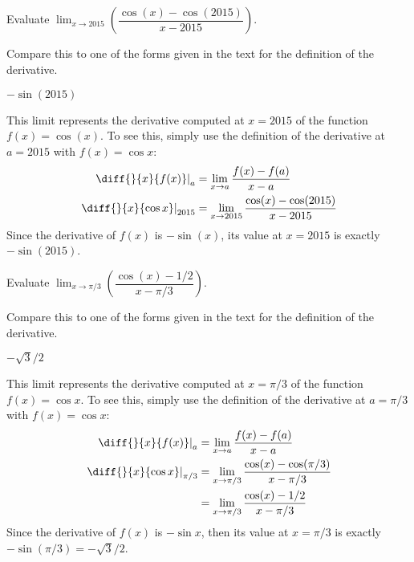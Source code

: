\subsection*{\Application}

\begin{question}[2015Q]
 Evaluate $\displaystyle \lim_{x\to 2015}\left(
\dfrac{\cos(x)-\cos(2015)}{x-2015}\right).$
\end{question}
\begin{hint}
Compare this to one of the forms given in the text for the definition of the derivative.
\end{hint}
\begin{answer}
{$-\sin(2015)$}
\end{answer}
\begin{solution}
This limit represents the derivative computed at $x=2015$ of the function
$f(x)=\cos(x)$. To see this, simply use the definition of the derivative at $a=2015$ with $f(x)=\cos x$:
\begin{align*}
\left.\diff{}{x}\{f(x)\}\right|_{a} &= \lim_{x \to a}\frac{f(x)-f(a)}{x-a}\\
\left.\diff{}{x}\{\cos x\}\right|_{2015} &= \lim_{x\to2015}\frac{\cos(x)-\cos(2015)}{x-2015}
\end{align*}
Since the derivative of $f(x)$ is $-\sin(x)$, its value at
$x=2015$ is exactly $-\sin(2015)$.
\end{solution}




\begin{question}[2015Q]
Evaluate $\displaystyle \lim_{x\to \pi/3}\left(
\dfrac{\cos(x)-1/2}{x-\pi/3}\right).$
\end{question}
\begin{hint}
Compare this to one of the forms given in the text for the definition of the derivative.
\end{hint}
\begin{answer}
{$-\sqrt{3}/2$}
\end{answer}
\begin{solution}
This limit represents the derivative computed at $x=\pi/3$ of the function
$f(x)=\cos x$. To see this, simply use the definition of the derivative at $a=\pi/3$ with $f(x)=\cos x$:
\begin{align*}
\left.\diff{}{x}\{f(x)\}\right|_{a} &= \lim_{x \to a}\frac{f(x)-f(a)}{x-a}\\
\left.\diff{}{x}\{\cos x\}\right|_{\pi/3} &= \lim_{x\to\pi/3}\frac{\cos(x)-\cos(\pi/3)}{x-\pi/3}\\
&=\lim_{x\to\pi/3} \frac{\cos(x)-1/2}{x-\pi/3}
\end{align*}
Since the derivative of $f(x)$ is $-\sin x$, then its
value at $x=\pi/3$ is exactly\\ $-\sin(\pi/3)=-\sqrt{3}/2$.
\end{solution}



